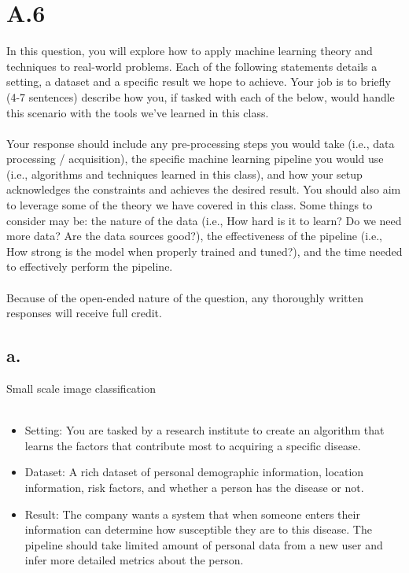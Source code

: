 \documentclass{article}
\newcommand{\1}{\mathbf{1}}
\begin{document}
\section*{A.6}
{\Large 

In this question, you will explore how to apply machine learning theory and techniques to real-world problems. Each of the following statements details a setting, a dataset and a specific result we hope to achieve. Your job is to briefly (4-7 sentences) describe how you, if tasked with each of the below, would handle this scenario with the tools we’ve learned in this class. \\ \\
Your response should include any pre-processing steps you would take (i.e., data processing / acquisition), the specific machine learning pipeline you would use (i.e., algorithms and techniques learned in this class), and how your setup acknowledges the constraints and achieves the desired result. You should also aim to leverage some of the theory we have covered in this class. Some things to consider may be: the nature of the data (i.e., How hard is it to learn? Do we need more data? Are the data sources good?), the effectiveness of the pipeline (i.e., How strong is the model when properly trained and tuned?), and the time needed to effectively perform the pipeline. \\ \\
Because of the open-ended nature of the question, any thoroughly written responses will receive full credit.

\subsection*{a.}

Small scale image classification \\ \\
\begin{itemize}
    \item Setting: You are tasked by a research institute to create an algorithm that learns the factors that contribute most to acquiring a specific disease.
    \item Dataset: A rich dataset of personal demographic information, location information, risk factors, and whether a person has the disease or not.
    \item Result: The company wants a system that when someone enters their information can determine how susceptible they are to this disease. The pipeline should take limited amount of personal data from a new user and infer more detailed metrics about the person.
\end{itemize}

}
\end{document}
